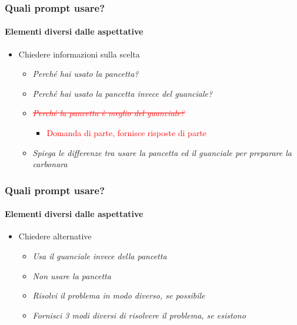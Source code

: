 \begin{exampleframe}
    \frametitle{Quali prompt usare?}
    \framesubtitle{Elementi diversi dalle aspettative}

    \begin{itemize}
        \item Chiedere informazioni sulla scelta
        \begin{itemize}
            \item \textit{Perché hai usato la pancetta?}
            \item \textit{Perché hai usato la pancetta invece del guanciale?}
            \item \textcolor{red}{\st{\textit{Perché la pancetta è meglio del guanciale?}}}
            \begin{itemize}
                \item \textcolor{red}{Domanda di parte, fornisce risposte di parte}
            \end{itemize}
            \item \textit{Spiega le differenze tra usare la pancetta ed il guanciale per preparare la carbonara}
        \end{itemize}
    \end{itemize}
\end{exampleframe}

\begin{exampleframe}
    \frametitle{Quali prompt usare?}
    \framesubtitle{Elementi diversi dalle aspettative}

    \begin{itemize}
        \item Chiedere alternative
        \begin{itemize}
            \item \textit{Usa il guanciale invece della pancetta}
            \item \textit{Non usare la pancetta}
            \item \textit{Risolvi il problema in modo diverso, se possibile}
            \item \textit{Fornisci 3 modi diversi di risolvere il problema, se esistono}
        \end{itemize}
    \end{itemize}
\end{exampleframe}

